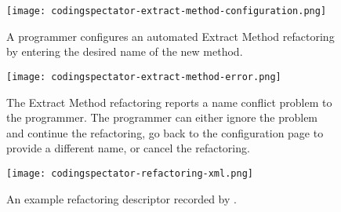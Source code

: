 \begin{figure}
%
\centering
%
\texttt{[image: codingspectator-extract-method-configuration.png]}
%
\caption{\label{FigCodingSpectatorExtractMethodConfigurationExample}A programmer
configures an automated Extract Method refactoring by entering the desired name
of the new method.}
%
\end{figure}

\begin{figure}
%
\centering
%
\texttt{[image: codingspectator-extract-method-error.png]}
%
\caption{\label{FigCodingSpectatorExtractMethodErrorExample}The Extract Method
refactoring reports a name conflict problem to the programmer. The programmer
can either ignore the problem and continue the refactoring, go back to the
configuration page to provide a different name, or cancel the refactoring.}
%
\end{figure}

\begin{figure}
%
\centering
%
\texttt{[image: codingspectator-refactoring-xml.png]}
%
\caption{\label{FigCodingSpectatorDescriptorExample}An example refactoring
descriptor recorded by \CodingSpectator.}
%
\end{figure}

%

